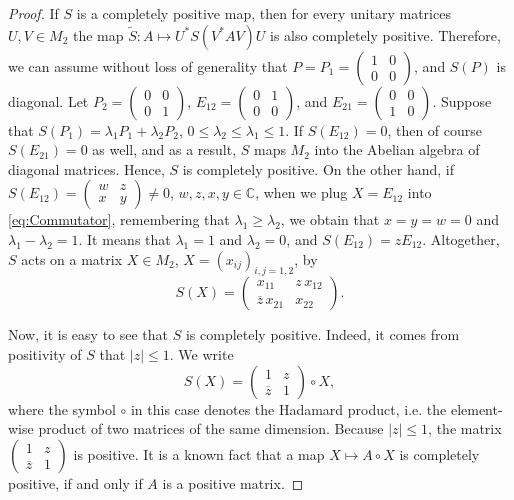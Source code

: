 \documentclass[12pt]{article}
\theoremstyle{plain}
\theoremstyle{definition}
\theoremstyle{remark}
\numberwithin{equation}{section}
\begin{document}
\begin{proof}
If $S$ is a completely positive map,
then for every unitary matrices $U, V \in M_{2}$
the map $\tilde{S}: A \mapsto U^{*} S(V^{*} A V) U$
is also completely positive.
Therefore, we can assume without loss of generality that
$P = P_{1} =
\left(
\begin{smallmatrix} 1 & 0 \\ 0 & 0 \end{smallmatrix}
\right)$,
and $S(P)$ is diagonal.
Let $P_{2} = \left(
\begin{smallmatrix} 0 & 0 \\ 0 & 1 \end{smallmatrix}
\right)$,
$E_{12} =
\left(
\begin{smallmatrix} 0 & 1 \\ 0 & 0 \end{smallmatrix}
\right)$,
and
$E_{21} =
\left(
\begin{smallmatrix} 0 & 0 \\ 1 & 0 \end{smallmatrix}
\right)$.
Suppose that
$S(P_{1}) = \lambda_{1} P_{1} + \lambda_{2} P_{2}$,
$0 \leq \lambda_{2} \leq \lambda_{1} \leq 1$.
If $S(E_{12}) = 0$,
then of course $S(E_{21}) = 0$ as well, and as a result,
$S$ maps $M_{2}$
into the Abelian algebra of diagonal matrices.
Hence, $S$ is completely positive.
On the other hand, if
$S(E_{12}) =
\left(
\begin{smallmatrix} w & z \\ x & y \end{smallmatrix}
\right) \neq 0$,
$w, z, x, y \in \mathbb{C}$,
when we plug $X = E_{12}$ into \eqref{eq:Commutator},
remembering that $\lambda_{1} \geq \lambda_{2}$,
we obtain that $x = y = w = 0$
and $\lambda_{1} - \lambda_{2} = 1$.
It means that $\lambda_{1} = 1$ and $\lambda_{2} = 0$,
and $S(E_{12}) = z E_{12}$.
Altogether, $S$ acts on a matrix
$X \in M_{2}$, $X = (x_{ij})_{i,j=1,2}$, by
\begin{equation}
S(X) = \begin{pmatrix}
 x_{11} & z \, x_{12} \\
\overline{z} \, x_{21} & x_{22}
\end{pmatrix}.
\end{equation}

Now, it is easy to see that $S$ is completely positive.
Indeed,
it comes from positivity of $S$ that $|z| \leq 1$.
We write
\begin{equation}
S(X) =
\begin{pmatrix}
1 & z \\ \overline{z} & 1
\end{pmatrix} \circ X,
\end{equation}
where the symbol $\circ$ in this case denotes the Hadamard product,
i.e. the element-wise product of two matrices of the same dimension.
Because $|z| \leq 1$, the matrix 
$
\left( 
\begin{smallmatrix} 1 & z \\ \overline{z} & 1 \end{smallmatrix}
\right)$
is positive.
It is a known fact that a map
$X \mapsto A \circ X$ is completely positive,
if and only if $A$ is a positive matrix.
\end{proof}
\end{document}
